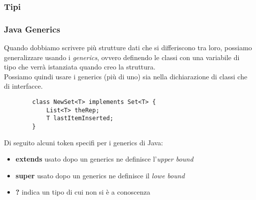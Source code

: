 \subsubsection{Tipi}

\subsubsection{Java Generics}
Quando dobbiamo scrivere più strutture dati che si differiscono tra loro, possiamo generalizzare usando i \textit{generics}, ovvero definendo le classi con una variabile di tipo che verrà istanziata quando creo la struttura. \\
Possiamo quindi usare i generics (più di uno) sia nella dichiarazione di classi che di interfacce.

\begin{example}
	\begin{lstlisting}
		class NewSet<T> implements Set<T> {
			List<T> theRep;
			T lastItemInserted;
		}
	\end{lstlisting}
\end{example}

Di seguito alcuni token specifi per i generics di Java:
\begin{itemize}
	\item \textbf{extends} usato dopo un generics ne definisce l'\textit{upper bound}
	\item \textbf{super} usato dopo un generics ne definisce il \textit{lowe bound}
	\item \textbf{?} indica un tipo di cui non si è a conoscenza
\end{itemize}

